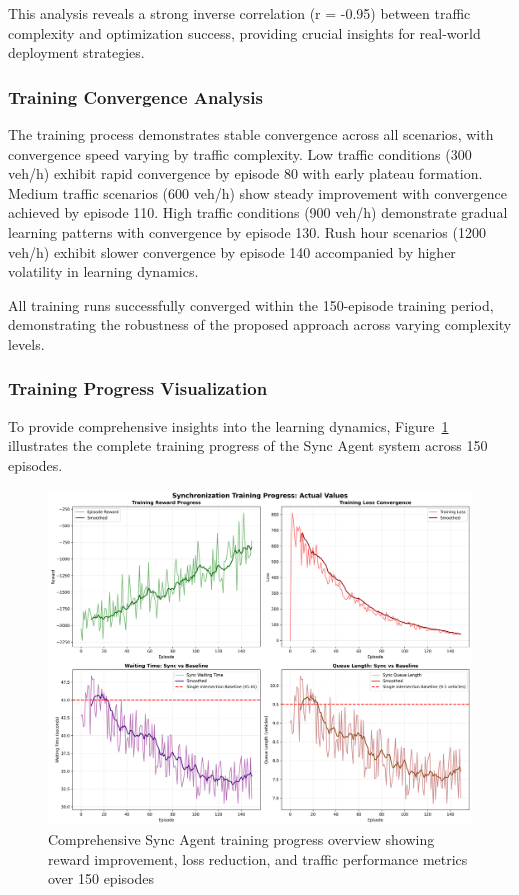 This analysis reveals a strong inverse correlation (r = -0.95) between traffic complexity and 
optimization success, providing crucial insights for real-world deployment strategies.

\subsubsection{Training Convergence Analysis}

The training process demonstrates stable convergence across all scenarios, with convergence speed 
varying by traffic complexity. Low traffic conditions (300 veh/h) exhibit rapid convergence by 
episode 80 with early plateau formation. Medium traffic scenarios (600 veh/h) show steady improvement 
with convergence achieved by episode 110. High traffic conditions (900 veh/h) demonstrate gradual 
learning patterns with convergence by episode 130. Rush hour scenarios (1200 veh/h) exhibit slower 
convergence by episode 140 accompanied by higher volatility in learning dynamics.

All training runs successfully converged within the 150-episode training period, demonstrating the 
robustness of the proposed approach across varying complexity levels.

\subsubsection{Training Progress Visualization}

To provide comprehensive insights into the learning dynamics, Figure~\ref{fig:sync_training_overview} 
illustrates the complete training progress of the Sync Agent system across 150 episodes.

\begin{figure}[!htb]
    \centering
    \includegraphics[width=\textwidth]{figures/ch4_sync_training_overview.png}
    \caption{Comprehensive Sync Agent training progress overview showing reward improvement, loss reduction, and traffic performance metrics over 150 episodes}
    \label{fig:sync_training_overview}
\end{figure}

